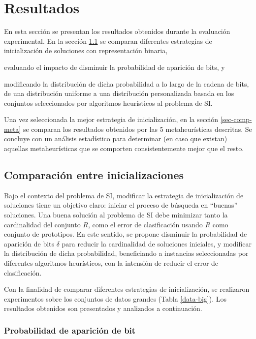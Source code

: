 \section{Resultados}

En esta sección se presentan los resultados obtenidos durante la evaluación experimental. En la sección \ref{sec-comp-inits} se comparan diferentes estrategias de inicialización de soluciones con representación binaria,
\begin{inparaenum}
\item evaluando el impacto de disminuir la probabilidad de aparición de bits, y
\item modificando la distribución de dicha probabilidad a lo largo de la cadena de bits, de una distribución uniforme a una distribución personalizada basada en los conjuntos seleccionados por algoritmos heurísticos al problema de SI.
\end{inparaenum}
Una vez seleccionada la mejor estrategia de inicialización, en la sección \ref{sec-comp-meta} se comparan los resultados obtenidos por las 5 metaheurísticas descritas. Se concluye con un análisis estadístico para determinar (en caso que existan) aquellas metaheurísticas que se comporten consistentemente mejor que el resto.

\subsection{Comparación entre inicializaciones}
\label{sec-comp-inits}

Bajo el contexto del problema de SI, modificar la estrategia de inicialización de soluciones tiene un objetivo claro: iniciar el proceso de búsqueda en ``buenas'' soluciones. Una buena solución al problema de SI debe minimizar tanto la cardinalidad del conjunto $R$, como el error de clasificación usando $R$ como conjunto de prototipos. En este sentido, se propone disminuir la probabilidad de aparición de bits $\delta$ para reducir la cardinalidad de soluciones iniciales, y modificar la distribución de dicha probabilidad, beneficiando a instancias seleccionadas por diferentes algoritmos heurísticos, con la intensión de reducir el error de clasificación.

Con la finalidad de comparar diferentes estrategias de inicialización, se realizaron experimentos sobre los conjuntos de datos grandes (Tabla \ref{data-big}). Los resultados obtenidos son presentados y analizados a continuación.

\subsubsection{Probabilidad de aparición de bit}

